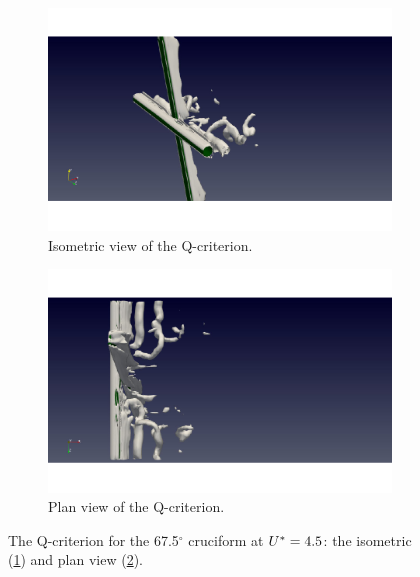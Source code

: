 \documentclass[oneside]{utmthesis}
\begin{document}
\begin{figure}
  \centering
  \begin{subfigure}[h]{0.9\textwidth}
    \includegraphics[width=\textwidth]{figs/qIso675U02}
    \caption{Isometric view of the Q-criterion.}
    \label{fig:qIso675U02}
  \end{subfigure}

  \begin{subfigure}[h]{0.9\textwidth}
    \includegraphics[width=\textwidth]{figs/qTop675U02}
    \caption{Plan view of the Q-criterion.}
    \label{fig:qTop675U02}
  \end{subfigure}

  \caption{The Q-criterion for the 67.5$^{\circ}$ cruciform at $U^{*} = 4.5$: the isometric (\ref{fig:qIso675U02}) and plan view (\ref{fig:qTop675U02}).} \label{fig:qCrit675U02}
\end{figure}
\end{document}
